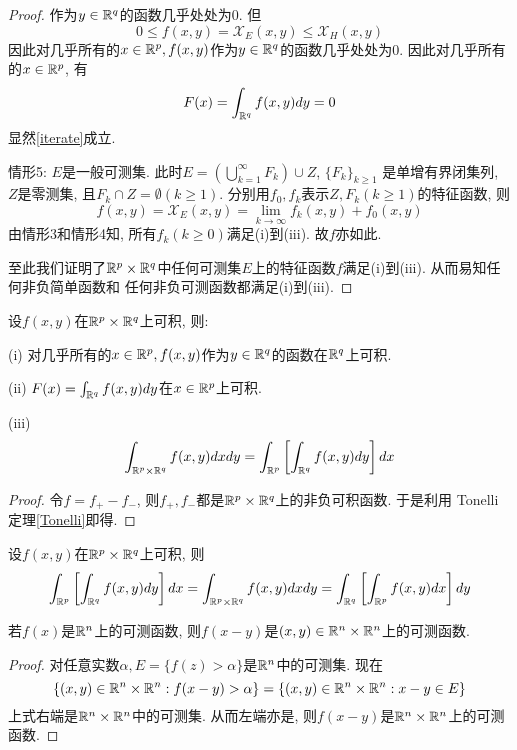 \documentclass[12pt, a4paper, oneside, UTF8]{ctexbook}  %
\begin{document}
\begin{proof}
    作为$y\in\mathbb{R}^q$的函数几乎处处为0. 但$$ 0\leq f(x, y)= \mathcal{X}_E(x, y)\leq \mathcal{X}_H(x, y)$$
    因此对几乎所有的$x\in\mathbb{R}^p, f(x, y)$作为$y\in\mathbb{R}^q$的函数几乎处处为0. 因此对几乎所有的$x\in\mathbb{R}^p$, 有
    $$ F(x) = \int_{\mathbb{R}^q}f(x, y)dy = 0 $$
    显然\ref{iterate}成立. 
    \vspace{1cm}
    \par 情形5: $E$是一般可测集. 此时$E = \left( \bigcup_{k = 1}^\infty F_k \right) \cup Z$, $\{F_k\}_{k\geq1}$
    是单增有界闭集列, $Z$是零测集, 且$F_k\cap Z = \emptyset(k\geq 1)$. 分别用$f_0, f_k$表示$Z, F_k(k\geq1)$的特征函数, 
    则$$ f(x, y) = \mathcal{X}_E(x, y) = \lim_{k\to\infty}f_k(x, y)+f_0(x, y) $$
    由情形3和情形4知, 所有$f_k(k\geq0)$满足(i)到(iii). 故$f$亦如此. 
    \par 至此我们证明了$\mathbb{R}^p\times\mathbb{R}^q$中任何可测集$E$上的特征函数$f$满足(i)到(iii). 从而易知任何非负简单函数和
    任何非负可测函数都满足(i)到(iii). 
\end{proof}

\begin{thm}[Fubini]\label{Fubini}
    设$f(x, y)$在$\mathbb{R}^p\times\mathbb{R}^q$上可积, 则:
    \item (i) 对几乎所有的$x\in \mathbb{R}^p, f(x, y)$作为$y\in\mathbb{R}^q$的函数在$\mathbb{R}^q$上可积.
    \item (ii) $F(x) = \int_{\mathbb{R}^q}f(x, y)dy$在$x\in \mathbb{R}^p$上可积.
    \item (iii) \begin{equation}
                    \int_{\mathbb{R}^p\times\mathbb{R}^q}f(x, y)dxdy = \int_{\mathbb{R}^p}\left[\int_{\mathbb{R}^q}f(x, y)dy\right]dx
                \end{equation}
\end{thm}

\begin{proof}
    令$f = f_+ - f_-$, 则$f_+, f_-$都是$\mathbb{R}^p\times\mathbb{R}^q$上的非负可积函数. 于是利用 Tonelli定理\ref{Tonelli}即得. 
\end{proof}

\begin{corollary}
    设$f(x, y)$在$\mathbb{R}^p\times\mathbb{R}^q$上可积, 则
    $$ \int_{\mathbb{R}^p}\left[\int_{\mathbb{R}^q}f(x, y)dy\right]dx = \int_{\mathbb{R}^p\times\mathbb{R}^q}f(x, y)dxdy =  \int_{\mathbb{R}^q}\left[\int_{\mathbb{R}^p}f(x, y)dx\right]dy$$
\end{corollary}


\begin{lemma}
    若$f(x)$是$\mathbb{R}^n$上的可测函数, 则$f(x-y)$是$(x, y)\in\mathbb{R}^n\times\mathbb{R}^n$上的可测函数. 
\end{lemma}

\begin{proof}
    对任意实数$\alpha, E = \{ f(z)>\alpha \}$是$\mathbb{R}^n$中的可测集. 现在
    $$ \{ (x, y)\in\mathbb{R}^n\times\mathbb{R}^n:f(x - y)>\alpha \} = \{ (x, y)\in\mathbb{R}^n\times\mathbb{R}^n:x-y\in E \} $$
    上式右端是$\mathbb{R}^n\times\mathbb{R}^n$中的可测集. 从而左端亦是, 则$f(x-y)$是$\mathbb{R}^n\times\mathbb{R}^n$上的可测函数. 
\end{proof}
\end{document}
